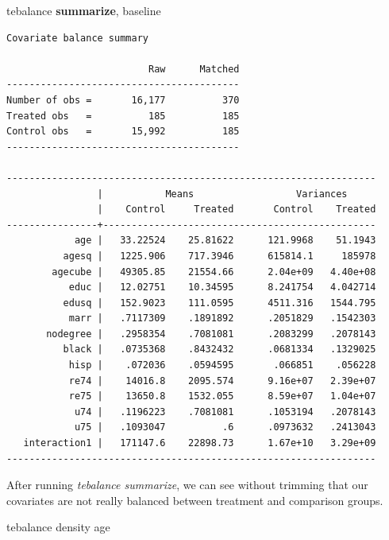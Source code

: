 \documentclass[
]{book}
\newenvironment{Shaded}{\begin{snugshade}}{\end{snugshade}}
\newcommand{\KeywordTok}[1]{\textcolor[rgb]{0.13,0.29,0.53}{\textbf{#1}}}
\newcommand{\NormalTok}[1]{#1}
\begin{document}
\begin{Shaded}
\begin{Highlighting}[]
\NormalTok{tebalance }\KeywordTok{summarize}\NormalTok{, baseline}
\end{Highlighting}
\end{Shaded}

\begin{verbatim}
Covariate balance summary

                         Raw      Matched
-----------------------------------------
Number of obs =       16,177          370
Treated obs   =          185          185
Control obs   =       15,992          185
-----------------------------------------

-----------------------------------------------------------------
                |           Means                  Variances     
                |    Control     Treated       Control    Treated
----------------+------------------------------------------------
            age |   33.22524    25.81622      121.9968    51.1943
          agesq |   1225.906    717.3946      615814.1     185978
        agecube |   49305.85    21554.66      2.04e+09   4.40e+08
           educ |   12.02751    10.34595      8.241754   4.042714
          edusq |   152.9023    111.0595      4511.316   1544.795
           marr |   .7117309    .1891892      .2051829   .1542303
       nodegree |   .2958354    .7081081      .2083299   .2078143
          black |   .0735368    .8432432      .0681334   .1329025
           hisp |    .072036    .0594595       .066851    .056228
           re74 |    14016.8    2095.574      9.16e+07   2.39e+07
           re75 |    13650.8    1532.055      8.59e+07   1.04e+07
            u74 |   .1196223    .7081081      .1053194   .2078143
            u75 |   .1093047          .6      .0973632   .2413043
   interaction1 |   171147.6    22898.73      1.67e+10   3.29e+09
-----------------------------------------------------------------
\end{verbatim}

After running \emph{tebalance summarize}, we can see without trimming that our covariates are not really balanced between treatment and comparison groups.

\begin{Shaded}
\begin{Highlighting}[]
\NormalTok{tebalance density age}
\end{Highlighting}
\end{Shaded}
\end{document}

